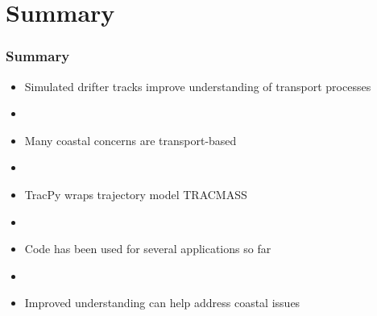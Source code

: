 \documentclass[ignorenonframetext]{beamer}
\begin{document}


\section{Summary}

\begin{frame}[t]\frametitle{Summary}
    \begin{itemize}
    	\item {\Large Simulated drifter tracks improve understanding of transport processes}
    	\item[] ~
    	\item {\Large Many coastal concerns are transport-based}
    	\item[] ~
    	\item {\Large TracPy wraps trajectory model TRACMASS}
    	\item[] ~
    	\item {\Large Code has been used for several applications so far}
    	\item[] ~
    	\item {\Large Improved understanding can help address coastal issues}
    \end{itemize}
\end{frame}
\end{document}
